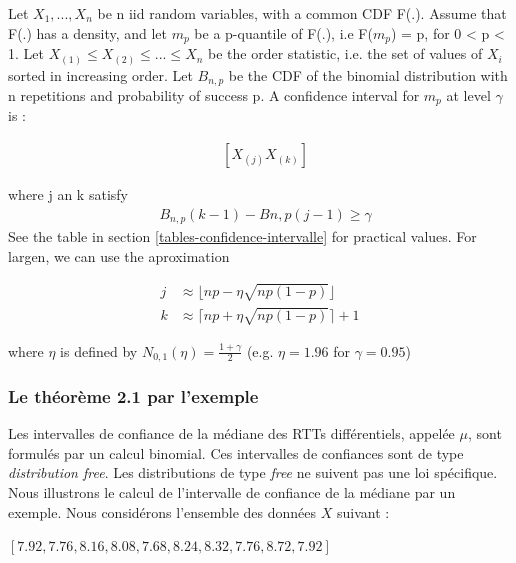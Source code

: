 \begin{tcolorbox}
	
	\begin{theorem}
		Let $X_1,..., X_n$ be n iid random variables, with a common CDF F(.). Assume that F(.) has a density, and let $m_p$ be a p-quantile of  F(.), i.e F($m_p$) = p, for 0 < p < 1.
		Let $X_{(1)} \leq X_{(2)} \leq ... \leq X_{n}$ be the order statistic, i.e. the set of values of $X_i$ sorted in increasing order. Let $B_{n,p}$ be the CDF of the binomial distribution with n repetitions and probability of success p. A confidence interval for $m_p$ at level $\gamma$ is :
		
		
		\begin{align*}
		&[X_{(j)}X_{(k)}]
		\end{align*}
		
		where j an k satisfy 
		\begin{align*}
		&B_{n,p}(k−1)−B{n,p}(j−1)≥\gamma
		\end{align*}
		See the table in section \ref{tables-confidence-intervalle} for practical values. For largen, we can use the aproximation 
		
		\begin{align}
		j&\approx \lfloor np - \eta  \sqrt{np(1-p)}\rfloor \label{align:formule-j}\\
		k&\approx \lceil np + \eta  \sqrt{np(1-p)}\rceil + 1 \label{align:formule-k}
		\end{align}
		\label{the21}
		
		where $\eta$ is defined by $N_{0,1}(\eta) = \frac{1+ \gamma}{2}$ (e.g. $\eta = 1.96$ for $\gamma = 0.95$)
	\end{theorem}
\end{tcolorbox}


\subsubsection{Le théorème 2.1 par l'exemple} \label{CI-theorem}

Les intervalles de confiance de la médiane des RTTs différentiels, appelée $\mu$, sont formulés par un calcul binomial. Ces intervalles de confiances sont de type \textit{distribution free}. Les distributions de type \textit{free} ne suivent pas une loi spécifique.
Nous illustrons le calcul de l'intervalle de confiance de la médiane par un exemple.  Nous considérons  l'ensemble des données $X$ suivant : 
\begin{center}
	$[7.92, 7.76, 8.16, 8.08, 7.68, 8.24, 8.32, 7.76, 8.72, 7.92]$
\end{center}


